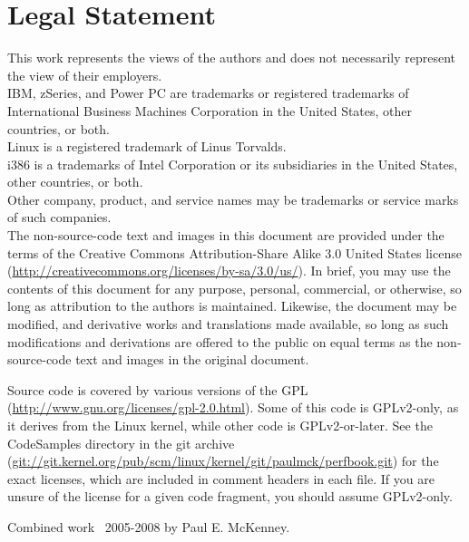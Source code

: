 
\section*{Legal Statement}

{ \small
This work represents the views of the authors and does not necessarily
represent the view of their employers.\\
IBM, zSeries, and Power PC are trademarks or registered trademarks of
International Business Machines Corporation in the United States,
other countries, or both.\\
Linux is a registered trademark of Linus Torvalds.\\
i386 is a trademarks of Intel Corporation or its
subsidiaries in the United States, other countries, or both. \\
Other company, product, and service names may be trademarks or service marks
of such companies.\\

The non-source-code text and images in this document are provided under
the terms of the Creative Commons Attribution-Share Alike 3.0 United
States license
(\url{http://creativecommons.org/licenses/by-sa/3.0/us/}).
In brief, you may use the contents of this document for any purpose,
personal, commercial, or otherwise, so long as attribution to the
authors is maintained.  Likewise, the document may be modified,
and derivative works and translations made available, so long as
such modifications and derivations are offered to the public on equal
terms as the non-source-code text and images in the original document.

Source code is covered by various versions of the GPL
(\url{http://www.gnu.org/licenses/gpl-2.0.html}).
Some of this code is GPLv2-only, as it derives from the Linux kernel,
while other code is GPLv2-or-later.
See the CodeSamples directory in the git archive
(\url{git://git.kernel.org/pub/scm/linux/kernel/git/paulmck/perfbook.git})
for the exact licenses, which are included in comment headers in each file.
If you are unsure of the license for a given code fragment,
you should assume GPLv2-only.

Combined work {\textcopyright}~2005-2008 by Paul E. McKenney.
}
